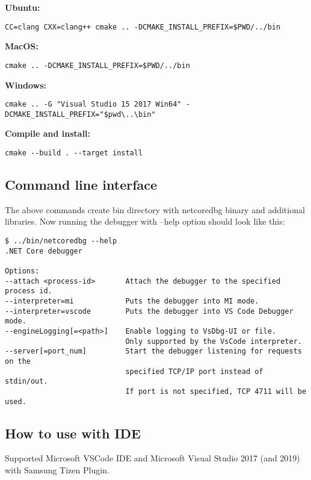\documentclass[a4paper,12pt]{article}
\begin{document}
\textbf{Ubuntu:}
\begin{lstlisting}[style=commandline,numbers=none]
CC=clang CXX=clang++ cmake .. -DCMAKE_INSTALL_PREFIX=$PWD/../bin
\end{lstlisting}

\textbf{MacOS:}
\begin{lstlisting}[style=commandline,numbers=none]
cmake .. -DCMAKE_INSTALL_PREFIX=$PWD/../bin
\end{lstlisting}

\textbf{Windows:}
\begin{lstlisting}[style=commandline,numbers=none]
cmake .. -G "Visual Studio 15 2017 Win64" -DCMAKE_INSTALL_PREFIX="$pwd\..\bin"
\end{lstlisting}

\textbf{Compile and install:}
\begin{lstlisting}[style=commandline,numbers=none]
cmake --build . --target install
\end{lstlisting}

\subsection{Command line interface}
The above commands create bin directory with netcoredbg binary and additional libraries. Now running the debugger with --help option should look like this:
\begin{lstlisting}[style=commandline,numbers=none]
$ ../bin/netcoredbg --help
.NET Core debugger

Options:
--attach <process-id>       Attach the debugger to the specified process id.
--interpreter=mi            Puts the debugger into MI mode.
--interpreter=vscode        Puts the debugger into VS Code Debugger mode.
--engineLogging[=<path>]    Enable logging to VsDbg-UI or file.
                            Only supported by the VsCode interpreter.
--server[=port_num]         Start the debugger listening for requests on the
                            specified TCP/IP port instead of stdin/out.
                            If port is not specified, TCP 4711 will be used.
\end{lstlisting}

\subsection{How to use with IDE}
Supported Microsoft VSCode IDE and Microsoft Visual Studio 2017 (and 2019) with Samsung Tizen Plugin.
\end{document}

